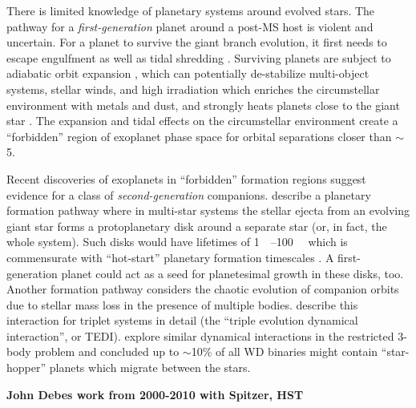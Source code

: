 \documentclass[twocolumn]{aastex631}
\begin{document}
There is limited knowledge of planetary systems around evolved stars. The pathway for a \textit{first-generation} planet around a post-MS host is violent and uncertain. For a planet to survive the giant branch evolution, it first needs to escape engulfment as well as tidal shredding \citep{burleighImagingPlanetsNearby2002a,nordhausOrbitsLowmassCompanions2013}. Surviving planets are subject to adiabatic orbit expansion \citep{jeansCosmogonicProblemsAssociated1924}, which can potentially de-stabilize multi-object systems, stellar winds, and high irradiation which enriches the circumstellar environment with metals and dust, and strongly heats planets close to the giant star \citep{mustillForetellingsRagnarokWorldengulfing2012,verasPostmainsequencePlanetarySystem2016}. The expansion and tidal effects on the circumstellar environment create a ``forbidden'' region of exoplanet phase space for orbital separations closer than $\sim$\qty{5}{\au}.

Recent discoveries of exoplanets in ``forbidden'' formation regions \citep{vanderburgGiantPlanetCandidate2020,blackmanJovianAnalogueOrbiting2021} suggest evidence for a class of \textit{second-generation} companions. \citet{peretsSecondGenerationPlanets2010,peretsPlanetsEvolvedBinary2011} describe a planetary formation pathway where in multi-star systems the stellar ejecta from an evolving giant star forms a protoplanetary disk around a separate star (or, in fact, the whole system). Such disks would have lifetimes of \qtyrange{1}{100}{\mega\year} which is commensurate with ``hot-start'' planetary formation timescales \citep{spiegelSpectralPhotometricDiagnostics2012a}. A first-generation planet could act as a seed for planetesimal growth in these disks, too. Another formation pathway considers the chaotic evolution of companion orbits due to stellar mass loss in the presence of multiple bodies. \citet{peretsTripleEvolutionDynamical2012} describe this interaction for triplet systems in detail (the ``triple evolution dynamical interaction'', or TEDI). \citet{kratterStarHoppersPlanet2012} explore similar dynamical interactions in the restricted 3-body problem and concluded up to $\sim$10\% of all WD binaries might contain ``star-hopper'' planets which migrate between the stars.

\textbf{John Debes work from 2000-2010 with Spitzer, HST}
\end{document}
